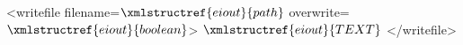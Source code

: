 <writefile filename=$\xmlstructref{eiout}{path}$ overwrite=$\xmlstructref{eiout}{boolean}$>
  $\xmlstructref{eiout}{TEXT}$
</writefile>
